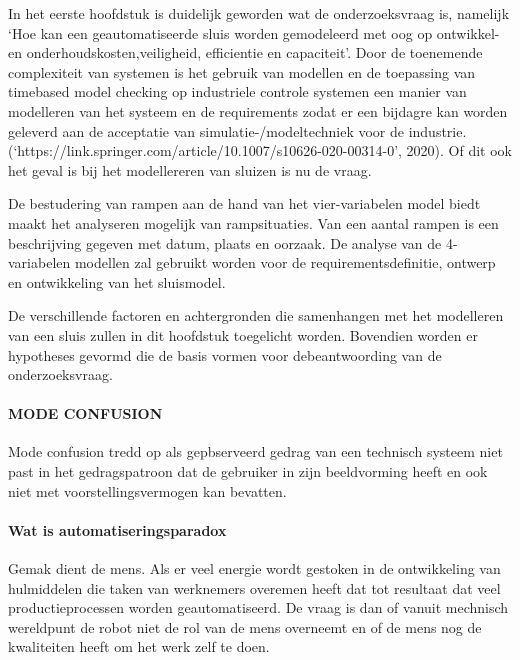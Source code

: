 
 




In het eerste hoofdstuk is duidelijk geworden wat de onderzoeksvraag is, namelijk ‘Hoe kan een geautomatiseerde sluis worden gemodeleerd met oog op ontwikkel- en onderhoudskosten,veiligheid, efficientie en capaciteit’. Door de toenemende complexiteit van systemen is het gebruik van modellen en de toepassing van timebased model checking  op industriele controle systemen een manier van modelleren van het systeem en de requirements zodat er een bijdagre kan worden geleverd aan de acceptatie van  simulatie-/modeltechniek voor de industrie.(‘https://link.springer.com/article/10.1007/s10626-020-00314-0’, 2020). Of dit ook het geval is bij het modellereren van sluizen is nu de vraag.

De bestudering van rampen aan de hand van het vier-variabelen model biedt maakt het analyseren mogelijk van rampsituaties. Van een aantal rampen is een beschrijving gegeven met datum, plaats en oorzaak. De analyse van de 4-variabelen modellen zal gebruikt worden voor de requirementsdefinitie, ontwerp en ontwikkeling van het sluismodel. 

De verschillende factoren en achtergronden die  samenhangen met het modelleren van een sluis zullen in dit hoofdstuk toegelicht worden. Bovendien worden er hypotheses gevormd die de basis vormen voor debeantwoording van de onderzoeksvraag. 




\paragraph{MODE CONFUSION }
Mode confusion tredd op als gepbserveerd gedrag van een technisch systeem niet past in het gedragspatroon dat de gebruiker in zijn beeldvorming heeft  en ook niet met voorstellingsvermogen kan bevatten.
\paragraph{Wat is automatiseringsparadox}
Gemak dient de mens. Als er veel energie wordt gestoken in de ontwikkeling van hulmiddelen die taken van werknemers overemen heeft dat tot resultaat dat veel productieprocessen worden geautomatiseerd. De vraag is dan of vanuit mechnisch wereldpunt de robot niet de rol van de mens overneemt en of de mens nog de kwaliteiten heeft om het werk zelf te doen.
\cite{bicker21102016automatiseringsparadox }
\cite{vseautoparadox }
\cite{blogxot21112016slimapparaat }


